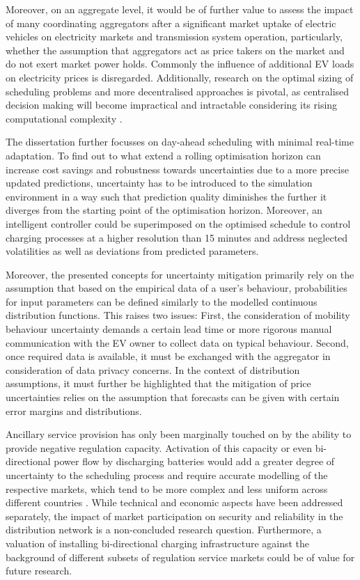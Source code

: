 Moreover, on an aggregate level, it would be of further value to assess the impact of many coordinating aggregators after a significant market uptake of electric vehicles on electricity markets and transmission system operation, particularly, whether the assumption that aggregators act as price takers on the market and do not exert market power holds. Commonly the influence of additional EV loads on electricity prices is disregarded. Additionally, research on the optimal sizing of scheduling problems and more decentralised approaches is pivotal, as centralised decision making will become impractical and intractable considering its rising computational complexity \cite{Mukherjee2015}.

The dissertation further focusses on day-ahead scheduling with minimal real-time adaptation. To find out to what extend a rolling optimisation horizon can increase cost savings and robustness towards uncertainties due to a more precise updated predictions, uncertainty has to be introduced to the simulation environment in a way such that prediction quality diminishes the further it diverges from the starting point of the optimisation horizon. Moreover, an intelligent controller could be superimposed on the optimised schedule to control charging processes at a higher resolution than 15 minutes and address neglected volatilities as well as deviations from predicted parameters.

Moreover, the presented concepts for uncertainty mitigation primarily rely on the assumption that based on the empirical data of a user's behaviour, probabilities for input parameters can be defined similarly to the modelled continuous distribution functions. This raises two issues: First, the consideration of mobility behaviour uncertainty demands a certain lead time or more rigorous manual communication with the EV owner to collect data on typical behaviour. Second, once required data is available, it must be exchanged with the aggregator in consideration of data privacy concerns. In the context of distribution assumptions, it must further be highlighted that the mitigation of price uncertainties relies on the assumption that forecasts can be given with certain error margins and distributions.

Ancillary service provision has only been marginally touched on by the ability to provide negative regulation capacity. Activation of this capacity or even bi-directional power flow by discharging batteries would add a greater degree of uncertainty to the scheduling process and require accurate modelling of the respective markets, which tend to be more complex and less uniform across different countries \cite{Ocker2016,Siddiqui2001}. While technical and economic aspects have been addressed separately, the impact of market participation on security and reliability in the distribution network is a non-concluded research question. Furthermore, a valuation of installing bi-directional charging infrastructure against the background of different subsets of regulation service markets could be of value for future research.

